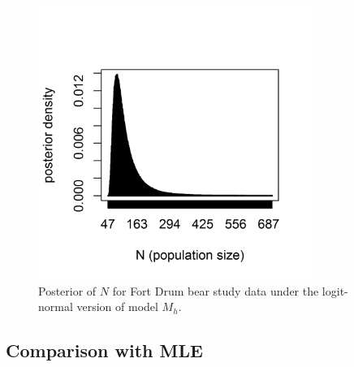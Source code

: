 \begin{figure}
\centering
\includegraphics[height=3.5in,width=3.5in]{Ch3-Closed/figs/bear-modelMh-post}
\caption{Posterior of $N$ for Fort Drum bear study data under the
logit-normal version of model $M_h$.
}
\label{closed.fig.bearMh}
\end{figure}

\subsection{Comparison with MLE}

